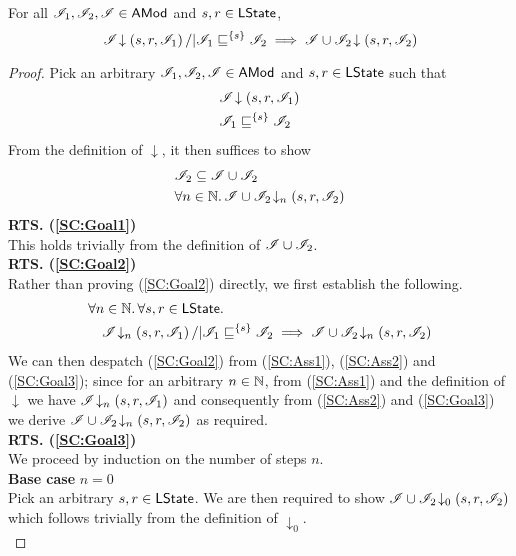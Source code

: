 %
%
%
\begin{lemma}\label{lem:shift-closure}
%
For all $\mathscr{I}_1, \mathscr{I}_2, \mathscr{I} \in \textsf{AMod}$ and $s, r \in \textsf{LState}$,
%
\[
	\mathscr{I} \!\downarrow \left(s, r, \mathscr{I}_1\right) /| \mathscr{I}_1 \sqsubseteq^{\{s\}} \mathscr{I}_2 \implies \mathscr{I} \cup \mathscr{I}_2 \!\downarrow \left(s, r, \mathscr{I}_2\right)
\]
%
\begin{proof} Pick an arbitrary $\mathscr{I}_1, \mathscr{I}_2, \mathscr{I} \in \textsf{AMod}$ and $s, r \in \textsf{LState}$ such that 
%
\begin{align}
	& \mathscr{I} \!\downarrow \left(s, r, \mathscr{I}_1\right) \label{SC:Ass1}\\
	& \mathscr{I}_1 \sqsubseteq^{\{s\}} \mathscr{I}_2 \label{SC:Ass2}
\end{align} 
%
From the definition of $\downarrow$, it then suffices to show
%
\begin{align}
	& \mathscr{I}_2 \subseteq \mathscr{I} \cup \mathscr{I}_2\label{SC:Goal1}\\
	& \forall n \in \mathbb{N}.\,  \mathscr{I} \cup \mathscr{I}_2 \!\downarrow_{n} \left(s, r, \mathscr{I}_2\right) \label{SC:Goal2}
\end{align}
%
\noindent\textbf{RTS. (\ref{SC:Goal1})} \\
This holds trivially from the definition of $\mathscr{I} \cup \mathscr{I}_2$.\\

\noindent\textbf{RTS. (\ref{SC:Goal2})} \\
Rather than proving (\ref{SC:Goal2}) directly, we first establish the following.
%
\begin{align}
	& \forall n \in \mathbb{N}.\, \forall s, r \in \textsf{LState}.\, \nonumber\\
	& \quad \mathscr{I} \!\downarrow_{n} \left(s, r, \mathscr{I}_1\right) /| \mathscr{I}_1 \sqsubseteq^{\{s\}} \mathscr{I}_2 \implies \mathscr{I} \cup \mathscr{I}_2 \!\downarrow_{n} \left(s, r, \mathscr{I}_2\right) \label{SC:Goal3}
\end{align}
%
We can then despatch (\ref{SC:Goal2}) from (\ref{SC:Ass1}), (\ref{SC:Ass2}) and (\ref{SC:Goal3}); since for an arbitrary $n \in \mathbb{N}$, from (\ref{SC:Ass1}) and the definition of $\downarrow$ we have $\mathscr{I} \!\downarrow_{n} \left(s, r, \mathscr{I}_1\right)$ and consequently from (\ref{SC:Ass2}) and (\ref{SC:Goal3}) we derive $\mathscr{I} \cup \mathscr{I}_2 \!\downarrow_{n} \left(s, r, \mathscr{I}_2\right) $ as required. \\

\noindent\textbf{RTS. (\ref{SC:Goal3})} \\
We proceed by induction on the number of steps $n$.\\

\noindent\textbf{Base case }$n=0$\\
Pick an arbitrary $s, r \in \textsf{LState}$. We are then required to show	$\mathscr{I} \cup \mathscr{I}_2 \!\downarrow_{0} \left(s, r, \mathscr{I}_2\right) $ which follows trivially from the definition of $\downarrow_0$.\\



\end{proof}
\end{lemma}
